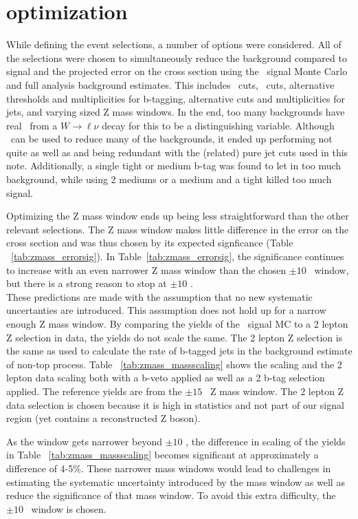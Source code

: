 \section{optimization}
\label{sec:Optimization}

While defining the event selections, a number of options were considered. All of the selections were chosen to simultaneously reduce the  background compared to signal and the projected error on the cross section using the \ttZ \ signal Monte Carlo and full analysis background estimates. This includes \Ht \ cuts, \met \ cuts, alternative thresholds and multiplicities for b-tagging, alternative  \pt cuts and multiplicities for jets, and varying sized Z mass windows. In the end, too many backgrounds have real \met \ from a $W \rightarrow \ell \nu$ decay for this to be a distinguishing variable. Although \Ht \ can be used to reduce many of the backgrounds, it ended up performing not quite as well as and being redundant with the (related) pure jet cuts used in this note. Additionally, a single tight or medium  b-tag was found to let in too much background, while using 2 mediums or a medium and a tight killed too much signal.  

Optimizing the Z mass window ends up being less straightforward than the other relevant selections. The Z mass window makes little difference in the error on the cross section and was thus chosen by its expected signficance (Table ~\ref{tab:zmass_errorsig}). In Table~\ref{tab:zmass_errorsig}, the significance continues to increase with an even narrower Z mass window than the chosen $\pm 10$ \GeV \ window, but there is a strong reason to stop at $\pm 10$ \GeV.\\

These predictions are made with the assumption that no new systematic uncertanties are introduced. This assumption does not hold up for a narrow enough Z mass window. By comparing the yields of the \ttZ \ signal MC to a 2 lepton Z selection in data, the yields do not scale the same. The 2 lepton Z selection is the same as used to calculate the rate of b-tagged jets in the background estimate of non-top process. Table ~\ref{tab:zmass_massscaling} shows the \ttZ scaling and the 2 lepton data scaling both with a b-veto applied as well as a 2 b-tag selection applied. The reference yields are from the $\pm 15$ \GeV \ Z mass window. The 2 lepton Z data selection is chosen because it is high in statistics and not part of our signal region (yet contains a reconstructed Z boson).

As the window gets narrower beyond $\pm 10$ \GeV, the difference in scaling of the yields in Table ~\ref{tab:zmass_massscaling} becomes significant at approximately a difference of 4-5\%. These narrower mass windows would lead to challenges in estimating the systematic uncertainty introduced by the mass window as well as reduce the significance of that mass window. To avoid this extra difficulty, the $\pm 10$ \GeV \ window is chosen.

